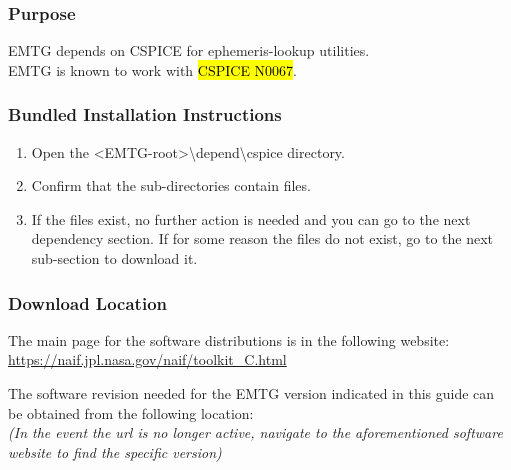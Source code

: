 
\subsubsection{Purpose}
\noindent \ac{EMTG} depends on CSPICE for ephemeris-lookup utilities. \\ \ac{EMTG} is known to work with \hl{CSPICE N0067}. 

\subsubsection{Bundled Installation Instructions}
\begin{enumerate}
	\item Open the \textless EMTG-root\textgreater \textbackslash depend\textbackslash cspice directory.
	\item Confirm that the sub-directories contain files.
	\item If the files exist, no further action is needed and you can go to the next dependency section. If for some reason the files do not exist, go to the next sub-section to download it.
\end{enumerate}

\subsubsection{Download Location}
\noindent The main page for the software distributions is in the following website: \\
\url{https://naif.jpl.nasa.gov/naif/toolkit_C.html} 


\noindent The software revision needed for the EMTG version indicated in this guide can be obtained from the following location: \\
\emph{(In the event the url is no longer active, navigate to the aforementioned software website to find the specific version)} \\

